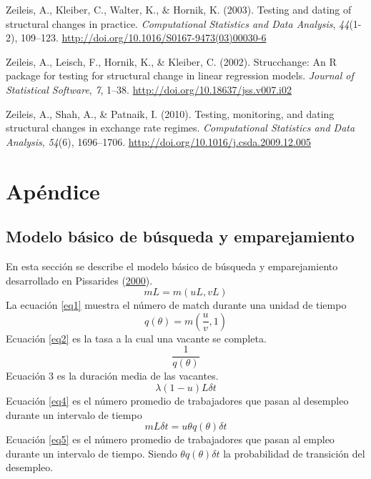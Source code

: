 \documentclass[12pt,oneside]{reedthesis}
\begin{document}
\leavevmode\hypertarget{ref-Zeileis2003}{}%
Zeileis, A., Kleiber, C., Walter, K., \& Hornik, K. (2003). Testing and dating of structural changes in practice. \emph{Computational Statistics and Data Analysis}, \emph{44}(1-2), 109--123. \url{http://doi.org/10.1016/S0167-9473(03)00030-6}

\leavevmode\hypertarget{ref-Zeileis2002}{}%
Zeileis, A., Leisch, F., Hornik, K., \& Kleiber, C. (2002). Strucchange: An R package for testing for structural change in linear regression models. \emph{Journal of Statistical Software}, \emph{7}, 1--38. \url{http://doi.org/10.18637/jss.v007.i02}

\leavevmode\hypertarget{ref-Zeileis2010}{}%
Zeileis, A., Shah, A., \& Patnaik, I. (2010). Testing, monitoring, and dating structural changes in exchange rate regimes. \emph{Computational Statistics and Data Analysis}, \emph{54}(6), 1696--1706. \url{http://doi.org/10.1016/j.csda.2009.12.005}

\appendix

\setlength{\parindent}{0.20in}
\setlength{\leftskip}{-0.20in}
\setlength{\parskip}{8pt}

\hypertarget{apuxe9ndice}{%
\chapter{Apéndice}\label{apuxe9ndice}}

\hypertarget{modelo-buxe1sico-de-buxfasqueda-y-emparejamiento}{%
\section{Modelo básico de búsqueda y emparejamiento}\label{modelo-buxe1sico-de-buxfasqueda-y-emparejamiento}}

En esta sección se describe el modelo básico de búsqueda y emparejamiento desarrollado en Pissarides (\protect\hyperlink{ref-Pissarides2000}{2000}).
\begin{equation} \label{eq1}
mL = m(uL, vL)
\end{equation}
La ecuación \eqref{eq1} muestra el número de match durante una unidad de tiempo
\begin{equation} \label{eq2}
q(\theta) = m(\frac{u}{v}, 1)
\end{equation}
Ecuación \eqref{eq2} es la tasa a la cual una vacante se completa.
\begin{equation} \label{eq3}
\frac{1}{q(\theta)}
\end{equation}
Ecuación 3 es la duración media de las vacantes.
\begin{equation} \label{eq4}
\lambda(1-u)L\delta t
\end{equation}
Ecuación \eqref{eq4} es el número promedio de trabajadores que pasan al desempleo durante un intervalo de tiempo
\begin{equation} \label{eq5}
mL\delta t = u\theta q(\theta)\delta t
\end{equation}
Ecuación \eqref{eq5} es el número promedio de trabajadores que pasan al empleo durante un intervalo de tiempo. Siendo \(\theta q(\theta)\delta t\) la probabilidad de transición del desempleo.
\end{document}
